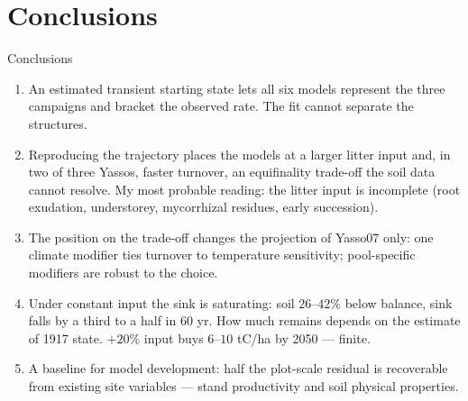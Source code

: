 \documentclass[aspectratio=169,11pt]{beamer}
\begin{document}
\section{Conclusions}

\begin{frame}{Conclusions}
  \footnotesize
  \begin{enumerate}
    \item An \alert{estimated} transient starting state lets all six models represent the three campaigns and bracket the observed rate. The fit cannot separate the structures.
    
    \item Reproducing the trajectory places the models at a \alert{larger litter input} and, in two of three Yassos, faster turnover, an equifinality trade-off the soil data cannot resolve. My most probable reading: the litter input is \alert{incomplete} (root exudation, understorey, mycorrhizal residues, early succession).
    
    \item The position on the trade-off \alert{changes the projection of Yasso07 only}: one climate modifier ties turnover to temperature sensitivity; pool-specific modifiers are robust to the choice.
    
    \item Under constant input the \alert{sink is saturating}: soil $26$--$42\%$ below balance, sink falls by a third to a half in 60 yr. How much remains depends on the estimate of 1917 state. $+20\%$ input buys $6$--$10$ tC/ha by 2050 --- finite.
    
    \item A \alert{baseline for model development}: half the plot-scale residual is recoverable from existing site variables --- stand productivity and soil physical properties.
    
  \end{enumerate}
\end{frame}
\end{document}
